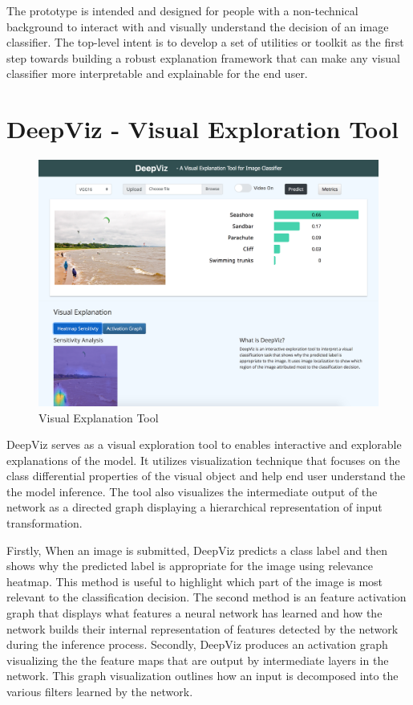 The prototype is intended and designed for people with a non-technical background to interact with and visually understand the decision of an image classifier. The top-level intent is to develop a set of utilities or toolkit as the first step towards building a robust explanation framework that can make any visual classifier more interpretable and explainable for the end user.


\section{DeepViz - Visual Exploration Tool}

\begin{figure}[htbp]
\centering
\includegraphics[width=1\textwidth]{images/DeepViz001.png}
\caption{Visual Explanation Tool}
\label{fig:DeepViz - Visual Explanation Tool}
\end{figure}

DeepViz serves as a visual exploration tool to enables interactive and explorable explanations of the model. It utilizes visualization technique that focuses on the class differential properties of the visual object and help end user understand the the model inference. The tool also visualizes the intermediate output of the network as a directed graph displaying a hierarchical representation of input transformation.

Firstly, When an image is submitted, DeepViz predicts a class label and then shows why the predicted label is appropriate for the image using relevance heatmap. This method is useful to highlight which part of the image is most relevant to the classification decision. The second method is an feature activation graph that displays what features a neural network has learned and how the network builds their internal representation of  features detected by the network during the inference process. Secondly, DeepViz produces an activation graph visualizing the the feature maps that are output by intermediate layers in the network. This graph visualization outlines how an input is decomposed into the various filters learned by the network.

